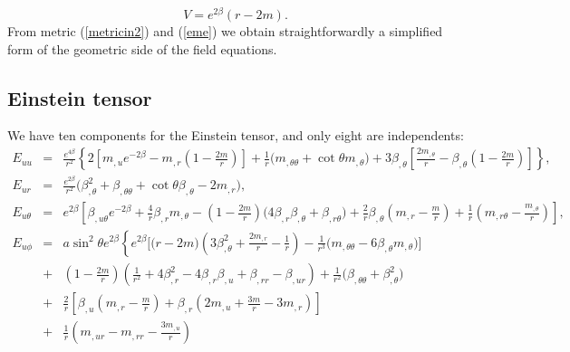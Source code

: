 \documentclass[twocolumn,superscriptaddress]{revtex4}
\begin{document}
\begin{equation}
V=e^{2\beta}(r-2m).
\label{eme}
\end{equation}
From metric (\ref{metricin2}) and (\ref{eme}) we obtain straightforwardly a simplified form of the geometric side of the field equations.
\begin{widetext}
\subsection{Einstein tensor}
We have ten components for the Einstein tensor, and only eight are independents:
\begin{eqnarray}
E_{uu}&=&\frac{e^{4\beta}}{r^2}\left\{ 2\left[m_{,u}e^{-2\beta}
-m_{,r}\left(1-\frac{2m}{r}\right)\right]
+\frac{1}{r}\bigg(m_{,\theta\theta}+\cot\theta m_{,\theta}\bigg)
+3\beta_{,\theta}\left[\frac{2m_{,\theta}}{r}-\beta_{,\theta}\left(1-\frac{2m}{r}\right)\right]\right\},\\
E_{ur}&=&\frac{e^{2\beta}}{r^2}\bigg(\beta_{,\theta}^2+\beta_{,\theta\theta}+\cot\theta\beta_{,\theta}-2m_{,r}\bigg),\\
E_{u\theta}&=&e^{2\beta}\left[ \beta_{,u\theta}e^{-2\beta}+\frac{4}{r}\beta_{,r}m_{,\theta}-\left(1-\frac{2m}{r}\right)\bigg(4\beta_{,r}\beta_{,\theta}+\beta_{,r\theta}\bigg)+\frac{2}{r}\beta_{,\theta}\left(m_{,r}-\frac{m}{r}\right)+\frac{1}{r}\left(m_{,r\theta}-\frac{m_{,\theta}}{r}\right)\right],\\
E_{u\phi}&=&a\sin^2\theta e^{2\beta}\left\{e^{2\beta}\bigg[\bigg(r-2m\bigg)\left(3\beta_{,\theta}^2+\frac{2m_{,r}}{r}-\frac{1}{r}\right)-\frac{1}{r^3}\bigg(m_{,\theta\theta}-6\beta_{,\theta}m_{,\theta}\bigg)\bigg]\right. \nonumber \\
&+&\left(1-\frac{2m}{r}\right)\left(\frac{1}{r^2}+4\beta_{,r}^2-4\beta_{,r}\beta_{,u}+\beta_{,rr}-\beta_{,ur}\right) + \frac{1}{r^2}\bigg(\beta_{,\theta\theta}+\beta_{,\theta}^2\bigg)\nonumber\\
&+&\frac{2}{r}\left[\beta_{,u}\left(m_{,r}-\frac{m}{r}\right)+\beta_{,r}\left(2m_{,u}+\frac{3m}{r}-3m_{,r}\right)\right] \nonumber \\
&+& \frac{1}{r}\left(m_{,ur}-m_{,rr}-\frac{3m_{,u}}{r}\right)\nonumber \\

\end{eqnarray}
\end{widetext}
\end{document}
